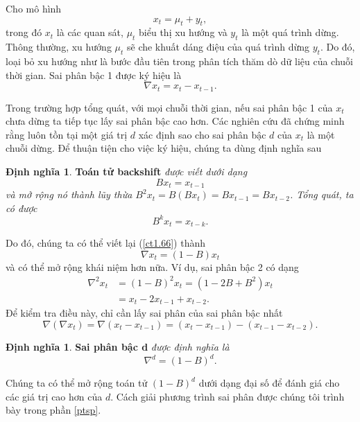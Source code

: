 \documentclass[12pt, a4paper,oneside]{book}
\theoremstyle{definition}
\newtheorem{dn}[theo]{Định nghĩa}
\begin{document}
Cho mô hình
\begin{equation}
x_{t}=\mu_{t}+y_{t}, \label{ct1.63}
\end{equation}
trong đó $x_{t}$ là các quan sát, $ \mu_{t} $ biểu thị xu hướng và $ y_{t} $ là một quá trình dừng. Thông thường, xu hướng $ \mu_{t} $ sẽ che khuất dáng điệu của quá trình dừng $ y_{t} $. Do đó, loại bỏ xu hướng như là bước đầu tiên trong phân tích thăm dò dữ liệu của chuỗi thời gian. Sai phân bậc 1 được ký hiệu là
\begin{equation}
\nabla x_{t}=x_{t}-x_{t-1}. \label{ct1.66}
\end{equation}

Trong trường hợp tổng quát, với mọi chuỗi thời gian, nếu sai phân bậc 1 của $ x_t $ chưa dừng ta tiếp tục lấy sai phân bậc cao hơn. Các nghiên cứu đã chứng minh rằng luôn tồn tại một giá trị $d$ xác định sao cho sai phân bậc $ d $ của $ x_t $ là một chuỗi dừng. Để thuận tiện cho việc ký hiệu, chúng ta dùng định nghĩa sau
\begin{dn}\cite{1} \textbf{Toán tử backshift} \textit{được viết dưới dạng}
	\textit{	\begin{equation}
		Bx_{t}=x_{t-1} \label{ct1.67}
		\end{equation}
		và mở rộng nó thành lũy thừa 	$B^{2}x_{t}=B(Bx_{t})=Bx_{t-1}=Bx_{t-2}$. Tổng quát, ta có được 
		\begin{equation}
		B^{k}x_{t}=x_{t-k}.\label{ct1.68}	
		\end{equation}}
\end{dn} 
Do đó, chúng ta có thể viết lại (\ref{ct1.66}) thành
\begin{equation}
\nabla x_{t}=(1-B)x_{t} \label{ct1.69}
\end{equation}
và có thể mở rộng khái niệm hơn nữa. Ví dụ, sai phân bậc 2 có dạng
\begin{align*}
\nabla^{2} x_{t} &=(1-B)^{2}x_{t}=(1-2B+B^{2})x_{t}\\
&=x_{t}-2x_{t-1}+x_{t-2}.	
\end{align*}
Để kiểm tra điều này, chỉ cần lấy sai phân của sai phân bậc nhất
$$\nabla(\nabla x_{t})=\nabla (x_{t}-x_{t-1})=(x_{t}-x_{t-1})-(x_{t-1}-x_{t-2}).$$
\begin{dn}\cite{1} 
	\textbf{Sai phân bậc d} \textit{được định nghĩa là
		\begin{equation}
		\nabla^{d}=(1-B)^{d}. \label{ct1.70}
		\end{equation}}
\end{dn}
Chúng ta có thể mở rộng toán tử $(1-B)^{d}$ dưới dạng đại số để đánh giá cho các giá trị cao hơn của $d$. Cách giải phương trình sai phân được chúng tôi trình bày trong phần \ref{ptsp}.
\end{document}
